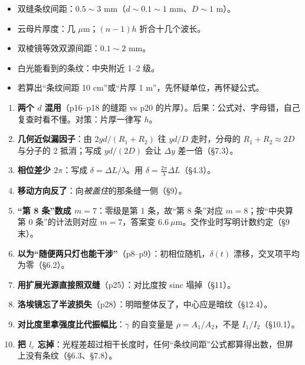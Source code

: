 \documentclass[11pt]{ctexart}
\begin{document}

\begin{itemize}
\item 双缝条纹间距：$0.5\sim3$ mm（$d\sim0.1\sim1$ mm、$D\sim1$ m）。
\item 云母片厚度：几 $\mu$m；$(n-1)h$ 折合十几个波长。
\item 双棱镜等效双源间距：$0.1\sim2$ mm。
\item 白光能看到的条纹：中央附近 1--2 级。
\item 若算出“条纹间距 10 cm”或“片厚 1 m”，先怀疑单位，再怀疑公式。
\end{itemize}

\flowerrule

\begin{enumerate}
\item \textbf{两个 $d$ 混用}（p16--p18 的缝距 vs p20 的片厚）。后果：公式对、字母错，自己复查时看不懂。对策：片厚一律写 $h$。
\item \textbf{几何近似漏因子}：由 $2yd/(R_1+R_2)$ 往 $yd/D$ 走时，分母的 $R_1+R_2\approx2D$ 与分子的 2 抵消；写成 $yd/(2D)$ 会让 $\Delta y$ 差一倍（\S7.3）。
\item \textbf{相位差少 $2\pi$}：写成 $\delta=\Delta L/\lambda$。用 $\delta=\frac{2\pi}{\lambda}\Delta L$（\S4.3）。
\item \textbf{移动方向反了}：向\emph{被盖住}的那条缝一侧（\S9）。
\item \textbf{“第 8 条”数成 $m=7$}：零级是第 1 条，故“第 8 条”对应 $m=8$；按“中央算第 0 条”的计法则对应 $m=7$，答案变 $6.6\ \mu$m。交作业时写明计数约定（\S9 末）。
\item \textbf{以为“随便两只灯也能干涉”}（p8--p9）：初相位随机，$\delta(t)$ 漂移，交叉项平均为零（\S6.2）。
\item \textbf{用扩展光源直接照双缝}（p25）：对比度按 sinc 塌掉（\S11）。
\item \textbf{洛埃镜忘了半波损失}（p28）：明暗整体反了，中心应是暗纹（\S12.4）。
\item \textbf{对比度里拿强度比代振幅比}：$\gamma$ 的自变量是 $\rho=A_1/A_2$，不是 $I_1/I_2$（\S10.1）。
\item \textbf{把 $l_c$ 忘掉}：光程差超过相干长度时，任何“条纹间距”公式都算得出数，但屏上没有条纹（\S6.3、\S7.8）。
\end{enumerate}

\flowerrule
\end{document}
